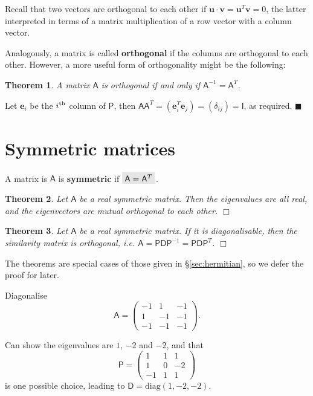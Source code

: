 \documentclass[letter-paper]{tufte-book}
\newtheorem{theorem}{\color{pastel-blue}Theorem}[section]
\newenvironment{proof}[1][Proof]{\begin{trivlist}
\item[\hskip \labelsep {\bfseries #1}]}{\end{trivlist}}
\newenvironment{example}[1][Example]{\begin{trivlist}
\item[\hskip \labelsep {\bfseries #1}]}{\end{trivlist}}
\newcommand{\As}{{\mathsf{A}}}
\newcommand{\Ds}{{\mathsf{D}}}
\newcommand{\Is}{{\mathsf{I}}}
\newcommand{\Ps}{{\mathsf{P}}}
\newcommand{\eb}{{\boldsymbol{e}}}
\newcommand{\ub}{{\boldsymbol{u}}}
\newcommand{\vb}{{\boldsymbol{v}}}
\newcommand{\qed}{\hfill$\blacksquare$}
\newcommand{\qedwhite}{\hfill \ensuremath{\Box}}
\newcommand{\highlight}[1]{\mathchoice%
  {\colorbox{black!10}{$\displaystyle#1$}}%
  {\colorbox{black!10}{$\textstyle#1$}}%
  {\colorbox{black!10}{$\scriptstyle#1$}}%
  {\colorbox{black!10}{$\scriptscriptstyle#1$}}}%
\begin{document}
Recall that two vectors are orthogonal to each other if $\ub\cdot\vb = \ub^T\vb
= 0$, the latter interpreted in terms of a matrix multiplication of a row vector
with a column vector. 

Analogously, a matrix is called \textbf{orthogonal} if the columns are
orthogonal to each other. However, a more useful form of orthogonality might be
the following:
\begin{theorem}
  A matrix $\As$ is orthogonal if and only if $\As^{-1} = \As^T$.
\end{theorem}

\begin{proof}
  Let $\eb_i$ be the $i^{\textnormal{th}}$ column of $\Ps$, then $\As \As^T =
  (\eb_i^T \eb_j) = (\delta_{ij}) = \Is$, as required. \qed
\end{proof}


\section{Symmetric matrices}

A matrix is $\As$ is \textbf{symmetric} if $\highlight{\As = \As^T}$.

\begin{theorem}\label{thm:real_sym_eigen}
  Let $\As$ be a real symmetric matrix. Then the eigenvalues are all real, and
  the eigenvectors are mutual orthogonal to each other. \qedwhite
\end{theorem}

\begin{theorem}
  Let $\As$ be a real symmetric matrix. If it is diagonalisable, then the
  similarity matrix is orthogonal, i.e. $\As = \Ps \Ds \Ps^{-1} = \Ps \Ds
  \Ps^T$. \qedwhite
\end{theorem}

The theorems are special cases of those given in \S\ref{sec:hermitian}, so we
defer the proof for later.

\begin{example}
  Diagonalise
  \begin{equation*}
    \As = \begin{pmatrix}-1 & 1 & -1 \\ 1 & -1 & -1 \\ -1 & -1 & -1\end{pmatrix}.
  \end{equation*}
  
  Can show the eigenvalues are $1$, $-2$ and $-2$, and that
  \begin{equation*}
    \Ps = \begin{pmatrix}1 & 1 & 1 \\ 1 & 0 & -2 \\ -1 & 1 & 1\end{pmatrix}
  \end{equation*}
  is one possible choice, leading to $\Ds = \mbox{diag}(1, -2, -2)$.
\end{example}
\end{document}
